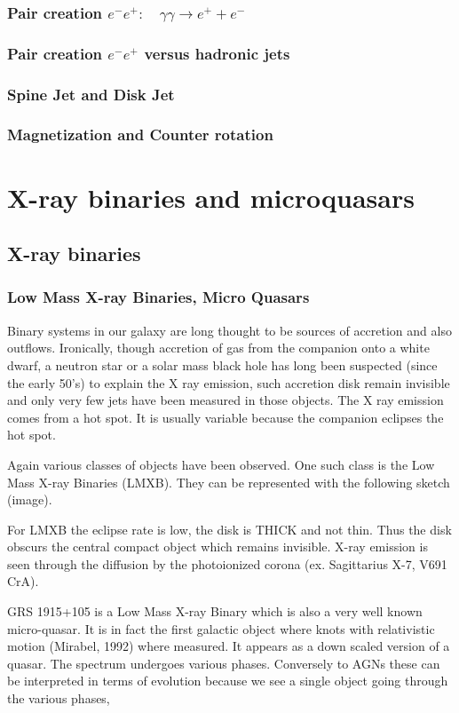 \documentclass[10pt,a4paper,english,draft]{article}
\begin{document}
\subsubsection{Pair creation $e^-e^+:\quad\gamma\gamma \rightarrow e^+ + e^-$}
\subsubsection{Pair creation $e^- e^+$ versus hadronic jets}
\subsubsection{Spine Jet and Disk Jet}
\subsubsection{Magnetization and Counter rotation}


\section{X-ray binaries and microquasars}
\subsection{X-ray binaries}
\subsubsection{Low Mass X-ray Binaries, Micro Quasars}
Binary systems in our galaxy are long thought to be sources of accretion and also outflows. Ironically, though accretion of gas from the companion onto a white dwarf, a neutron star or a solar mass black hole has long been suspected (since the early 50's) to explain the X ray emission, such accretion disk remain invisible and only very few jets have been measured in those objects. The X ray emission comes from a hot spot. It is usually variable because the companion eclipses the hot spot.

Again various classes of objects have been observed. One such class is the Low Mass X-ray Binaries (LMXB). They can be represented with the following sketch (image).

For LMXB the eclipse rate is low, the disk is THICK and not thin. Thus the disk obscurs the central compact object which remains invisible. X-ray emission is seen through the diffusion by the photoionized corona (ex. Sagittarius X-7, V691 CrA).

GRS 1915+105 is a Low Mass X-ray Binary which is also a very well known micro-quasar. It is in fact the first galactic object where knots with relativistic motion (Mirabel, 1992) where measured. It appears as a down scaled version of a quasar. The spectrum undergoes various phases. Conversely to AGNs these can be interpreted in terms of evolution because we see a single object going through the various phases,
\end{document}

